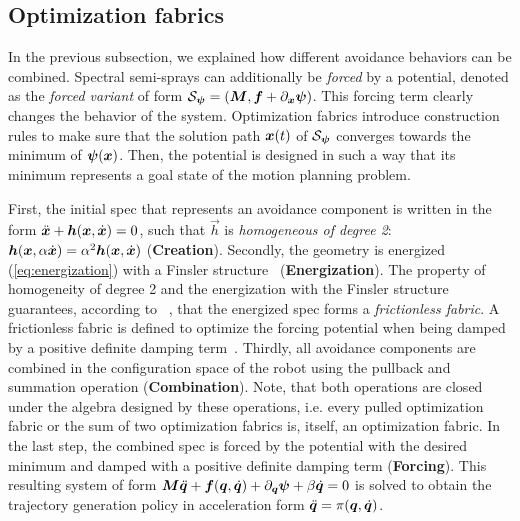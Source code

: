 \subsection{Optimization fabrics}%
\label{sub:optimization_fabrics}
%
In the previous subsection, we explained how different avoidance behaviors can
be combined. Spectral semi-sprays can additionally be \textit{forced} by a
potential, denoted as the \textit{forced variant} of form $\mathcal{S}_{\bm{\psi}} =
\left(\bm{M},\bm{f} + \partial_{\bm{x}}\bm{\psi}\right)$. This forcing term clearly changes the
behavior of the system. Optimization fabrics introduce construction rules to
make sure that the solution path $\bm{x}(t)$ of $\mathcal{S}_{\bm{\psi}}$ converges towards
the minimum of $\bm{\psi}(\bm{x})$. Then, the potential is designed in such a way that
its minimum represents a goal state of the motion planning problem.

First, the initial spec that represents an avoidance component
is written in the form $\ddot{\bm{x}} + \bm{h}(\bm{x},\dot{\bm{x}}) = 0$,
such that $\vec{h}$ is \textit{homogeneous of degree 2}:
$\bm{h}(\bm{x},\alpha\dot{\bm{x}}) = \alpha^2\bm{h}(\bm{x},\dot{\bm{x}})$ 
(\textbf{Creation}). 
Secondly, the geometry is
energized (\cref{eq:energization})
with a Finsler structure~\cite[Definition 5.4]{Ratliff2020} (\textbf{Energization}).
The property of homogeneity of degree 2 and the energization with the Finsler structure
guarantees, according to ~\cite[Theorem 4.29]{Ratliff2020}, that the energized spec
forms a \textit{frictionless fabric}.
A frictionless fabric is defined to optimize the forcing potential \forc{} when being
damped by a positive definite damping term~\cite[Definition 4.4]{Ratliff2020}.
Thirdly, all avoidance components are combined in the configuration space
of the robot using the pullback and summation operation (\textbf{Combination}).
Note, that both operations are closed 
under the algebra designed by these operations, i.e. every pulled optimization fabric or the sum
of two optimization fabrics is, itself, an optimization fabric.
In the last step, the combined spec is forced by the potential \forc{} with the desired minimum and
damped with a positive definite damping term (\textbf{Forcing}).
This resulting system of form $\bm{M}\ddot{\bm{q}} + \bm{f}(\bm{q}, \dot{\bm{q}}) + \partial_{\bm{q}}\bm{\psi} + \beta\dot{\bm{q}} = 0$ is solved to 
obtain the trajectory generation policy in acceleration form $\ddot{\bm{q}} = \pi(\bm{q},\dot{\bm{q}})$.

